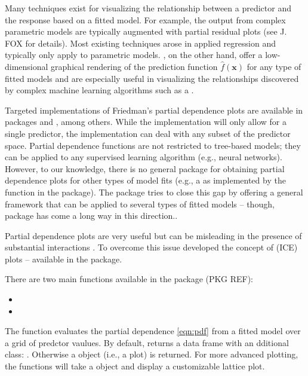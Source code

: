 
Many techniques exist for visualizing the relationship between a predictor and the response based on a fitted model. For example, the output from complex parametric models are typically augmented with partial residual plots (see J. FOX for details). Most existing techniques arose in applied regression and typically only apply to parametric models.  \citep{friedman-2000-greedy}, on the other hand, offer a low-dimensional graphical rendering of the prediction function $\widehat{f}\left(\boldsymbol{x}\right)$ for any type of fitted models and are especially useful in visualizing the relationships discovered by complex machine learning algorithms such as a .

Targeted implementations of Friedman's partial dependence plots are available in packages  \citep{randomForest-pkg} and , among others. While the  implementation will only allow for a single predictor, the  implementation can deal with any subset of the predictor space. Partial dependence functions are not restricted to tree-based models; they can be applied to any supervised learning algorithm (e.g., neural networks). However, to our knowledge, there is no general package for obtaining partial dependence plots for other types of model fits (e.g., a  as implemented by the  function in the  package). The  package tries to close this gap by offering a general framework that can be applied to several types of fitted models -- though, package  has come a long way in this direction..

Partial dependence plots are very useful but can be misleading in the presence of substantial interactions \citep{goldstein-peeking-2015}. To overcome this issue \citet{goldstein-peeking-2015} developed the concept of  (ICE) plots -- available in the  package.

There are two main functions available in the  package (PKG REF):
\begin{itemize}
  \item {}
  \item {}
\end{itemize}
The  function evaluates the partial dependence \eqref{eqn:pdf} from a fitted model over a grid of predctor vaulues. By default,  returns a data frame with an dditional class: . Otherwise a  object (i.e., a plot) is returned. For more advanced plotting, the  functions will take a  object and display a customizable lattice plot.

